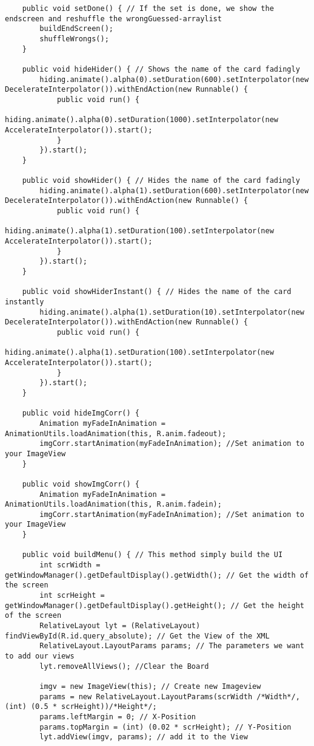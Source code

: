 \begin{lstlisting}
    public void setDone() { // If the set is done, we show the endscreen and reshuffle the wrongGuessed-arraylist
        buildEndScreen();
        shuffleWrongs();
    }

    public void hideHider() { // Shows the name of the card fadingly
        hiding.animate().alpha(0).setDuration(600).setInterpolator(new DecelerateInterpolator()).withEndAction(new Runnable() {
            public void run() {
                hiding.animate().alpha(0).setDuration(1000).setInterpolator(new AccelerateInterpolator()).start();
            }
        }).start();
    }

    public void showHider() { // Hides the name of the card fadingly
        hiding.animate().alpha(1).setDuration(600).setInterpolator(new DecelerateInterpolator()).withEndAction(new Runnable() {
            public void run() {
                hiding.animate().alpha(1).setDuration(100).setInterpolator(new AccelerateInterpolator()).start();
            }
        }).start();
    }

    public void showHiderInstant() { // Hides the name of the card instantly
        hiding.animate().alpha(1).setDuration(10).setInterpolator(new DecelerateInterpolator()).withEndAction(new Runnable() {
            public void run() {
                hiding.animate().alpha(1).setDuration(100).setInterpolator(new AccelerateInterpolator()).start();
            }
        }).start();
    }

    public void hideImgCorr() {
        Animation myFadeInAnimation = AnimationUtils.loadAnimation(this, R.anim.fadeout);
        imgCorr.startAnimation(myFadeInAnimation); //Set animation to your ImageView
    }

    public void showImgCorr() {
        Animation myFadeInAnimation = AnimationUtils.loadAnimation(this, R.anim.fadein);
        imgCorr.startAnimation(myFadeInAnimation); //Set animation to your ImageView
    }

    public void buildMenu() { // This method simply build the UI
        int scrWidth = getWindowManager().getDefaultDisplay().getWidth(); // Get the width of the screen
        int scrHeight = getWindowManager().getDefaultDisplay().getHeight(); // Get the height of the screen
        RelativeLayout lyt = (RelativeLayout) findViewById(R.id.query_absolute); // Get the View of the XML
        RelativeLayout.LayoutParams params; // The parameters we want to add our views
        lyt.removeAllViews(); //Clear the Board

        imgv = new ImageView(this); // Create new Imageview
        params = new RelativeLayout.LayoutParams(scrWidth /*Width*/, (int) (0.5 * scrHeight))/*Height*/;
        params.leftMargin = 0; // X-Position
        params.topMargin = (int) (0.02 * scrHeight); // Y-Position
        lyt.addView(imgv, params); // add it to the View


\end{lstlisting}
